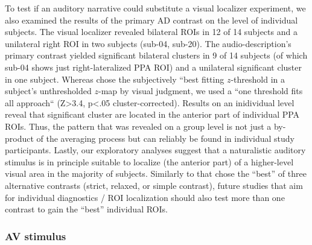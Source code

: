 \documentclass[english]{article}
\begin{document}


To test if an auditory narrative could substitute a visual localizer experiment,
we also examined the results of the primary AD contrast on the level of
individual subjects.
The visual localizer \citep{sengupta2016extension} revealed bilateral ROIs in 12
of 14 subjects and a unilateral right ROI in two subjects (sub-04, sub-20).
The audio-description's primary contrast yielded significant bilateral clusters
in 9 of 14 subjects (of which sub-04 shows just right-lateralized PPA ROI) and a
unilateral significant cluster in one subject.
%
Whereas \citep{sengupta2016extension} chose the subjectively ``best fitting
$z$-threshold in a subject's unthresholded $z$-map by visual judgment, we used a
``one threshold fits all approach`` (Z>3.4, p<.05 cluster-corrected).
Results on an inidividual level reveal that significant cluster are located in
the anterior part of individual PPA ROIs. Thus, the pattern that was revealed on
a group level is not just a by-product of the averaging process but can reliably
be found in individual study participants.
Lastly, our exploratory analyses suggest that a naturalistic auditory stimulus
is in principle suitable to localize (the anterior part) of a higher-level
visual area in the majority of subjects.
Similarly to \citep{sengupta2016extension} that chose the ``best'' of three
alternative contrasts (strict, relaxed, or simple contrast), future studies that
aim for individual diagnostics / ROI localization should also test more than one
contrast to gain the ``best'' individual ROIs.



\subsubsection{AV stimulus}
\end{document}

